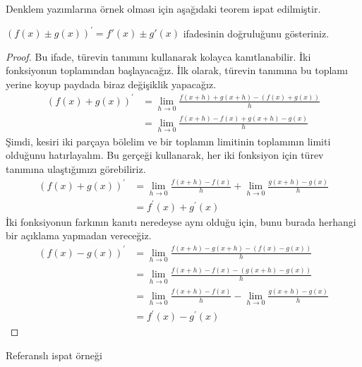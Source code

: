 \documentclass[12pt,oneside]{report}
\begin{document}
        Denklem yazımlarına örnek olması için aşağıdaki teorem ispat edilmiştir.
        \begin{theorem}
            ${\left( {f\left( x \right) \pm g\left( x \right)} \right)^\prime } = f'\left( x \right) \pm g'\left( x \right)$ ifadesinin doğruluğunu gösteriniz.
        \end{theorem}
        \begin{proof}
            Bu ifade, türevin tanımını kullanarak kolayca kanıtlanabilir. İki fonksiyonun toplamından başlayacağız. İlk olarak, türevin tanımına bu toplamı yerine koyup paydada biraz değişiklik yapacağız.
            \begin{align*} %
                (f(x)+g(x))^{\prime} & =\lim _{h \rightarrow 0} \frac{f(x+h)+g(x+h)-(f(x)+g(x))}{h} \\
                & =\lim _{h \rightarrow 0} \frac{f(x+h)-f(x)+g(x+h)-g(x)}{h}
            \end{align*}
            Şimdi, kesiri iki parçaya bölelim ve bir toplamın limitinin toplamının limiti olduğunu hatırlayalım. Bu gerçeği kullanarak, her iki fonksiyon için türev tanımına ulaştığımızı görebiliriz.
            \begin{align}
                (f(x)+g(x))^{\prime} & =\lim _{h \rightarrow 0} \frac{f(x+h)-f(x)}{h}+\lim _{h \rightarrow 0} \frac{g(x+h)-g(x)}{h} \\
                & =f^{\prime}(x)+g^{\prime}(x)
            \end{align}
            İki fonksiyonun farkının kanıtı neredeyse aynı olduğu için, bunu burada herhangi bir açıklama yapmadan vereceğiz.
            \begin{align}
                (f(x)-g(x))^{\prime} & =\lim _{h \rightarrow 0} \frac{f(x+h)-g(x+h)-(f(x)-g(x))}{h} \\
                & =\lim _{h \rightarrow 0} \frac{f(x+h)-f(x)-(g(x+h)-g(x))}{h} \\
                & =\lim _{h \rightarrow 0} \frac{f(x+h)-f(x)}{h}-\lim _{h \rightarrow 0} \frac{g(x+h)-g(x)}{h} \\
                & =f^{\prime}(x)-g^{\prime}(x)
            \end{align}
        \end{proof}
	
	\begin{refproof}
		Referanslı ispat örneği
	\end{refproof}
	
\end{document}

